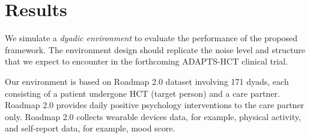 \section{Results}


\label{sec:testbed}


We simulate a \textit{dyadic environment} to evaluate the performance of the proposed framework. The environment design should replicate the noise level and structure that we expect to encounter in the forthcoming ADAPTS-HCT clinical trial. 

Our environment is based on Roadmap 2.0 dataset involving 171 dyads, each consisting of a patient undergone HCT (target person) and a care partner. Roadmap 2.0 provides daily positive psychology interventions to the care partner only. Roadmap 2.0 collects wearable devices data, for example, physical activity, and self-report data, for example, mood score.




